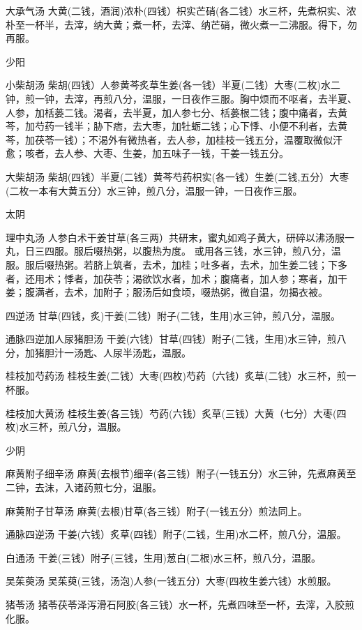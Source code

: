 \documentclass[a4paper,12pt,UTF8,twoside]{ctexbook}
\begin{document}
	大承气汤
	大黄(二钱，酒润)浓朴(四钱）枳实芒硝(各二钱）水三杯，先煮枳实、浓朴至一杯半，去滓，纳大黄；煮一杯，去滓、纳芒硝，微火煮一二沸服。得下，勿再服。
	
	
	少阳	
	
	小柴胡汤
	柴胡(四钱）人参黄芩炙草生姜(各一钱）半夏(二钱）大枣(二枚)水二钟，煎一钟，去滓，再煎八分，温服，一日夜作三服。胸中烦而不呕者，去半夏、人参，加栝蒌二钱。渴者，去半夏，加人参七分、栝蒌根二钱；腹中痛者，去黄芩，加芍药一钱半；胁下痞，去大枣，加牡蛎二钱；心下悸、小便不利者，去黄芩，加茯苓一钱）；不渴外有微热者，去人参，加桂枝一钱五分，温覆取微似汗愈；咳者，去人参、大枣、生姜，加五味子一钱，干姜一钱五分。
	
	大柴胡汤
	柴胡(四钱）半夏(二钱）黄芩芍药枳实(各一钱）生姜(二钱,五分）大枣(二枚一本有大黄五分）水三钟，煎八分，温服一钟，一日夜作三服。
	
	
	太阴	
	
	理中丸汤
	人参白术干姜甘草(各三两）共研末，蜜丸如鸡子黄大，研碎以沸汤服一丸，日三四服。服后啜热粥，以腹热为度。
	或用各三钱，水三钟，煎八分，温服。服后啜热粥。若脐上筑者，去术，加桂；吐多者，去术，加生姜二钱；下多者，还用术；悸者，加茯苓；渴欲饮水者，加术；腹痛者，加人参；寒者，加干姜；腹满者，去术，加附子；服汤后如食顷，啜热粥，微自温，勿揭衣被。
	
	四逆汤
	甘草(四钱，炙)干姜(二钱）附子(二钱，生用)水三钟，煎八分，温服。
	
	通脉四逆加人尿猪胆汤
	干姜(六钱）甘草(四钱）附子(二钱，生用)水三钟，煎八分，加猪胆汁一汤匙、人尿半汤匙，温服。
	
	桂枝加芍药汤
	桂枝生姜(二钱）大枣(四枚)芍药（六钱）炙草(二钱）水三杯，煎一杯服。
	
	桂枝加大黄汤
	桂枝生姜(各三钱）芍药(六钱）炙草(三钱）大黄（七分）大枣(四枚)水三杯，煎八分，温服。
	
	
	少阴	
	
	麻黄附子细辛汤
	麻黄(去根节)细辛(各三钱）附子(一钱五分）水三钟，先煮麻黄至二钟，去沫，入诸药煎七分，温服。
	
	麻黄附子甘草汤
	麻黄(去根)甘草(各三钱）附子(一钱五分）煎法同上。
	
	通脉四逆汤
	干姜(六钱）炙草(四钱）附子(二钱，生用)水二杯，煎八分，温服。
	
	白通汤
	干姜(三钱）附子(三钱，生用)葱白(二根)水三杯，煎八分，温服。
	
	吴茱萸汤
	吴茱萸(三钱，汤泡)人参(一钱五分）大枣(四枚生姜六钱）水煎服。
	
	猪苓汤
	猪苓茯苓泽泻滑石阿胶(各三钱）水一杯，先煮四味至一杯，去滓，入胶煎化服。
	
\end{document}
